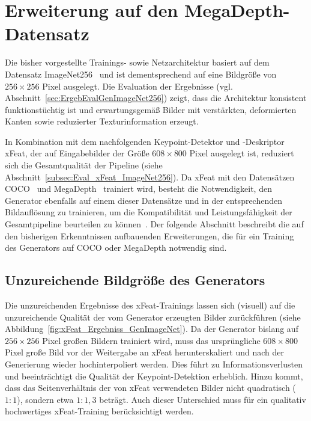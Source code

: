 {\section{Erweiterung auf den MegaDepth-Datensatz}
\label{sec:ErweiterungAufMegaDepth}
Die bisher vorgestellte Trainings- sowie Netzarchitektur basiert auf dem Datensatz ImageNet256~\cite{Uriot2023imageNet} und ist dementsprechend auf eine Bildgröße von $256 \times 256$ Pixel ausgelegt. 
Die Evaluation der Ergebnisse (vgl. Abschnitt~\ref{sec:ErgebEvalGenImageNet256}) zeigt, dass die Architektur konsistent funktionstüchtig ist und erwartungsgemäß Bilder mit verstärkten, deformierten Kanten sowie reduzierter Texturinformation erzeugt.

In Kombination mit dem nachfolgenden Keypoint-Detektor und -Deskriptor \ac{xFeat}, der auf Eingabebilder der Größe $608 \times 800$ Pixel ausgelegt ist, reduziert sich die Gesamtqualität der Pipeline (siehe Abschnitt~\ref{subsec:Eval_xFeat_ImageNet256}).
Da \ac{xFeat} mit den Datensätzen \mbox{COCO~\cite{lin2015microsoft}} und \mbox{MegaDepth~\cite{li2018megadepth}} trainiert wird, besteht die Notwendigkeit, den Generator ebenfalls auf einem dieser Datensätze und in der entsprechenden Bildauflösung zu trainieren, um die Kompatibilität und Leistungsfähigkeit der Gesamtpipeline beurteilen zu können~\cite{potje2024xfeat}.
Der folgende Abschnitt beschreibt die auf den bisherigen Erkenntnissen aufbauenden Erweiterungen, die für ein Training des Generators auf COCO oder MegaDepth notwendig sind.




\subsection{Unzureichende Bildgröße des Generators}
Die unzureichenden Ergebnisse des \ac{xFeat}-Trainings lassen sich (visuell) auf die unzureichende Qualität der vom Generator erzeugten Bilder zurückführen (siehe Abbildung~\ref{fig:xFeat_Ergebniss_GenImageNet}). 
Da der Generator bislang auf $256 \times 256$ Pixel großen Bildern trainiert wird, muss das ursprüngliche $608 \times 800$ Pixel große Bild vor der Weitergabe an \ac{xFeat} herunterskaliert und nach der Generierung wieder hochinterpoliert werden. 
Dies führt zu Informationsverlusten und beeinträchtigt die Qualität der Keypoint-Detektion erheblich. 
Hinzu kommt, dass das Seitenverhältnis der von \ac{xFeat} verwendeten Bilder nicht quadratisch ($1:1$), sondern etwa $1:1,3$ beträgt. Auch dieser Unterschied muss für ein qualitativ hochwertiges \ac{xFeat}-Training berücksichtigt werden.  

}
